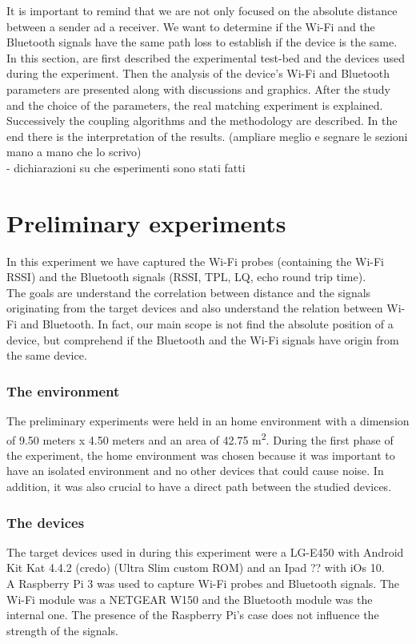 \linebreak
It is important to remind that we are not only focused on the absolute distance between a sender ad a receiver. We want to determine if the Wi-Fi and the Bluetooth signals have the same path loss to establish if the device is the same.\\
\linebreak  
In this section, are first described the experimental test-bed and the devices used during the experiment. Then the analysis of the device's Wi-Fi and Bluetooth parameters are presented along with discussions and graphics. After the study and the choice of the parameters, the real matching experiment is explained. Successively the coupling algorithms and the methodology are described. In the end there is the interpretation of the results. (ampliare meglio e segnare le sezioni mano a mano che lo scrivo)\\

- dichiarazioni su che esperimenti sono stati fatti\\
\section{Preliminary experiments}
In this experiment we have captured the Wi-Fi probes (containing the Wi-Fi RSSI) and the Bluetooth signals (RSSI, TPL, LQ, echo round trip time).\\
The goals are understand the correlation between distance and the signals originating from the target devices and also understand the relation between Wi-Fi and Bluetooth. In fact, our main scope is not find the absolute position of a device, but comprehend if the Bluetooth and the Wi-Fi signals have origin from the same device. 
\subsubsection{The environment}
The preliminary experiments were held in an home environment with a dimension of 9.50 meters x 4.50 meters and an area of 42.75 m\textsuperscript{2}.
During the first phase of the experiment, the home environment was chosen because it was important to have an isolated environment and no other devices that could cause noise. In addition, it was also crucial to have a direct path between the studied devices.\\
\subsubsection{The devices}
The target devices used in during this experiment were a LG-E450 with Android Kit Kat 4.4.2 (credo) (Ultra Slim custom ROM) and an Ipad ?? with iOs 10. \\
\linebreak
A Raspberry Pi 3 was used to capture Wi-Fi probes and Bluetooth signals. The Wi-Fi module was a NETGEAR W150 and the Bluetooth module was the internal one. The presence of the Raspberry Pi's case does not influence the strength of the signals.
